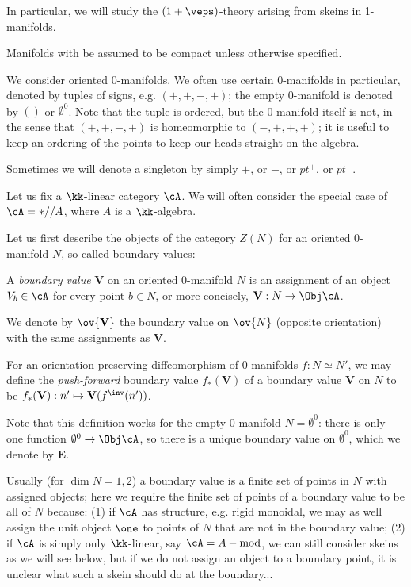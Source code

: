 \documentclass[12pt]{article}
\newcommand{\empt}[1]{{\emptyset^{#1}}}
\newcommand{\VV}{{\mathbf{V}}}
\newcommand{\EE}{{\mathbf{E}}}
\begin{document}
In particular, we will study the $(1+\veps)$-theory
arising from skeins in 1-manifolds.

Manifolds with be assumed to be compact
unless otherwise specified.

We consider oriented 0-manifolds.
We often use certain 0-manifolds in particular,
denoted by tuples of signs, e.g. $(+,+,-,+)$;
the empty 0-manifold is denoted by $()$ or $\empt{0}$.
Note that the tuple is ordered, but the 0-manifold itself
is not, in the sense that
$(+,+,-,+)$ is homeomorphic to $(-,+,+,+)$;
it is useful to keep an ordering of the points
to keep our heads straight on the algebra.

Sometimes we will denote a singleton by simply $+$,
or $-$, or $pt^+$, or $pt^-$.

Let us fix a $\kk$-linear category $\cA$.
We will often consider the special case of
$\cA = *//A$, where $A$ is a $\kk$-algebra.

Let us first describe the objects of the category
$Z(N)$ for an oriented 0-manifold $N$,
so-called boundary values:

\begin{definition}
A \emph{boundary value} $\VV$ on an oriented 0-manifold $N$
is an assignment of an object $V_b \in \cA$
for every point $b \in N$,
or more concisely, $\VV: N \to \Obj \cA$.

We denote by $\ov{\VV}$ the boundary value on $\ov{N}$
(opposite orientation) with the same assignments as $\VV$.

For an orientation-preserving diffeomorphism of 0-manifolds
$f: N \simeq N'$,
we may define the \emph{push-forward} boundary value
$f_*(\VV)$ of a boundary value $\VV$ on $N$
to be $f_*(\VV): n' \mapsto \VV(f^\inv(n'))$.
\end{definition}

Note that this definition works for the empty 0-manifold
$N = \empt{0}$: there is only one function $\empt{0} \to \Obj \cA$,
so there is a unique boundary value on $\empt{0}$,
which we denote by $\EE$.

\begin{remark}
\label{r:boundary-value}
Usually (for $\dim N = 1,2$)
a boundary value is a finite set of points in $N$
with assigned objects;
here we require the finite set of points of a boundary value
to be all of $N$ because:
(1) if $\cA$ has structure, e.g. rigid monoidal,
we may as well assign the unit object $\one$ to points
of $N$ that are not in the boundary value;
(2) if $\cA$ is simply only $\kk$-linear,
say $\cA = A-\text{mod}$,
we can still consider skeins as we will see below,
but if we do not assign an object to a boundary point,
it is unclear what such a skein should do at the boundary...
\end{remark}
\end{document}
